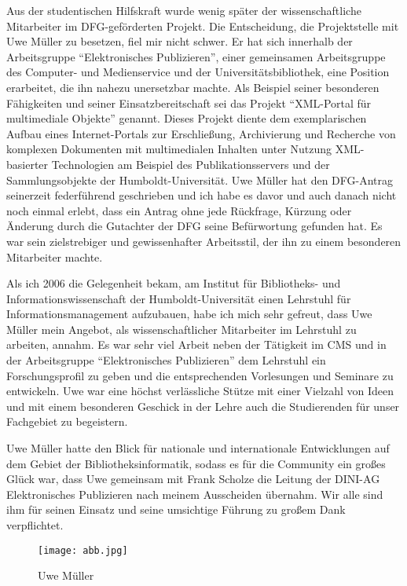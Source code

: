 \documentclass[a4paper,
fontsize=11pt,
oneside,
numbers=noperiodatend,
parskip=half-,
bibliography=totoc,
final
]{scrartcl}
\begin{document}
Aus der studentischen Hilfskraft wurde wenig später der
wissenschaftliche Mitarbeiter im DFG-geförderten Projekt. Die
Entscheidung, die Projektstelle mit Uwe Müller zu besetzen, fiel mir
nicht schwer. Er hat sich innerhalb der Arbeitsgruppe
\enquote{Elektronisches Publizieren}, einer gemeinsamen Arbeitsgruppe
des Computer- und Medienservice und der Universitätsbibliothek, eine
Position erarbeitet, die ihn nahezu unersetzbar machte. Als Beispiel
seiner besonderen Fähigkeiten und seiner Einsatzbereitschaft sei das
Projekt \enquote{XML-Portal für multimediale Objekte} genannt. Dieses
Projekt diente dem exemplarischen Aufbau eines Internet-Portals zur
Erschließung, Archivierung und Recherche von komplexen Dokumenten mit
multimedialen Inhalten unter Nutzung XML-basierter Technologien am
Beispiel des Publikationsservers und der Sammlungsobjekte der
Humboldt-Universität. Uwe Müller hat den DFG-Antrag seinerzeit
federführend geschrieben und ich habe es davor und auch danach nicht
noch einmal erlebt, dass ein Antrag ohne jede Rückfrage, Kürzung oder
Änderung durch die Gutachter der DFG seine Befürwortung gefunden hat. Es
war sein zielstrebiger und gewissenhafter Arbeitsstil, der ihn zu einem
besonderen Mitarbeiter machte.

Als ich 2006 die Gelegenheit bekam, am Institut für Bibliotheks- und
Informationswissenschaft der Humboldt-Universität einen Lehrstuhl für
Informationsmanagement aufzubauen, habe ich mich sehr gefreut, dass Uwe
Müller mein Angebot, als wissenschaftlicher Mitarbeiter im Lehrstuhl zu
arbeiten, annahm. Es war sehr viel Arbeit neben der Tätigkeit im CMS und
in der Arbeitsgruppe \enquote{Elektronisches Publizieren} dem Lehrstuhl
ein Forschungsprofil zu geben und die entsprechenden Vorlesungen und
Seminare zu entwickeln. Uwe war eine höchst verlässliche Stütze mit
einer Vielzahl von Ideen und mit einem besonderen Geschick in der Lehre
auch die Studierenden für unser Fachgebiet zu begeistern.

Uwe Müller hatte den Blick für nationale und internationale
Entwicklungen auf dem Gebiet der Bibliotheksinformatik, sodass es für
die Community ein großes Glück war, dass Uwe gemeinsam mit Frank Scholze
die Leitung der DINI-AG Elektronisches Publizieren nach meinem
Ausscheiden übernahm. Wir alle sind ihm für seinen Einsatz und seine
umsichtige Führung zu großem Dank verpflichtet.

\begin{figure}
\centering
\texttt{[image: abb.jpg]}
\caption{Uwe Müller}
\end{figure}
\end{document}
